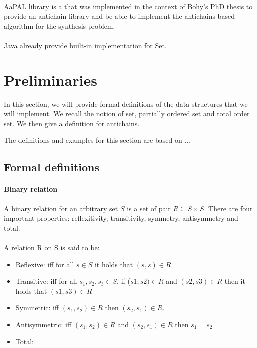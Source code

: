 \documentclass[letterpaper]{article}
\begin{document}
\paragraph{}

AaPAL library is a that was implemented in the context of Bohy's PhD thesis
to provide an antichain library and be able to implement the antichains
based algorithm for the synthesis problem.

\paragraph{}

Java already provide built-in implementation for Set.

\section{Preliminaries}

In this section, we will provide formal definitions of the data
structures that we will implement. We recall the notion of set, partially
ordered set and total order set. We then give a definition for antichains.

The definitions and examples for this section are based on ...

\subsection{Formal definitions}


\paragraph{Binary relation}

A binary relation for an arbitrary set $S$ is
a set of pair $R \subseteq S \times S$.
There are four important properties: reflexitivity, transitivity,
symmetry, antisymmetry and total.

\paragraph{}

A relation R on S is said to be:

\begin{itemize}
    \item Reflexive:
    iff for all $s \in S$ it holds that $(s, s) \in R$
    \item Transitive:
    iff for all $s_1, s_2, s_3 \in S$,
    if ($s1, s2) \in R$ and $(s2, s3) \in R$
    then it holds that $(s1, s3) \in R$
    \item Symmetric: iff $(s_1, s_2) \in R$ then $(s_2, s_1) \in R$.
    \item Antisymmetric: iff $(s_1, s_2) \in R$
    and $(s_2, s_1) \in R$ then $s_1 = s_2$
    \item Total: 
\end{itemize}
\end{document}
